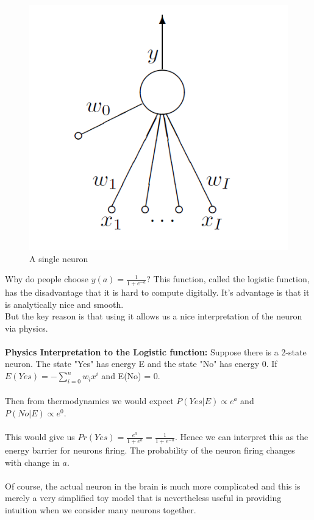 \documentclass{article}%
\begin{document}
\begin{figure}[H]
	\centering
		\includegraphics[scale=0.56]{SingleNeuron.PNG}
   	\caption{A single neuron}
\end{figure}

Why do people choose $y(a) = \frac{1}{1+e^{-a}}$?
This function, called the logistic function, has the disadvantage that it is hard to compute digitally. It's advantage is that it is analytically nice and smooth.
\\
But the key reason is that using it allows us a nice interpretation of the neuron via physics.
\\ \\
\textbf{Physics Interpretation to the Logistic function:}
Suppose there is a 2-state neuron. The state "Yes" has energy E and the state "No" has energy 0.
If $E(Yes) =-\sum_{i=0}^nw_ix^i$ and E(No) = 0.
\\ \\
Then from thermodynamics we would expect $P(Yes|E) \propto e^a$ and $P(No|E) \propto e^0$.
\\ \\
This would give us $Pr(Yes) = \frac{e^a}{1+e^a} = \frac{1}{1+e^{-a}}$.
Hence we can interpret this as the energy barrier for neurons firing. The probability of the neuron firing changes with change in $a$.
\\ \\
Of course, the actual neuron in the brain is much more complicated and this is merely a very simplified toy model that is nevertheless useful in providing intuition when we consider many neurons together.
\end{document}
